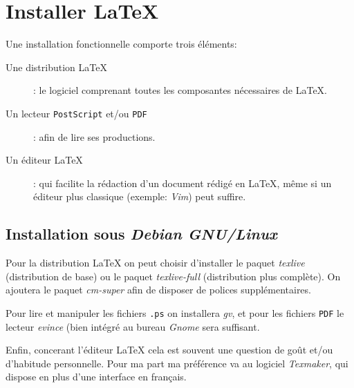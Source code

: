 
\chapter{Installer \LaTeX}
Une installation fonctionnelle comporte trois éléments:
\medskip

\begin{description}
\item[Une distribution \LaTeX]: le logiciel comprenant toutes les composantes nécessaires de \LaTeX.
\item[Un lecteur \texttt{PostScript} et/ou \texttt{PDF}]: afin de lire ses productions.
\item[Un éditeur \LaTeX]: qui facilite la rédaction d'un document rédigé en \LaTeX{}, même si un éditeur plus classique (exemple: \textit{Vim}) peut suffire.
\end{description}
\medskip

\section*{Installation sous \textit{Debian GNU/Linux}}
Pour la distribution \LaTeX{} on peut choisir d'installer le paquet \textit{texlive} (distribution de base) ou le paquet \textit{texlive-full} (distribution plus complète). On ajoutera le paquet \textit{cm-super} afin de disposer de polices supplémentaires.
\medskip

Pour lire et manipuler les fichiers \texttt{.ps} on installera \textit{gv}, et pour les fichiers \texttt{PDF} le lecteur \textit{evince} (bien intégré au bureau \textit{Gnome} sera suffisant.
\medskip

Enfin, concerant l'éditeur \LaTeX{} cela est souvent une question de goût et/ou d'habitude personnelle. Pour ma part ma préférence va au logiciel \textit{Texmaker}, qui dispose en plus d'une interface en français.
\medskip
